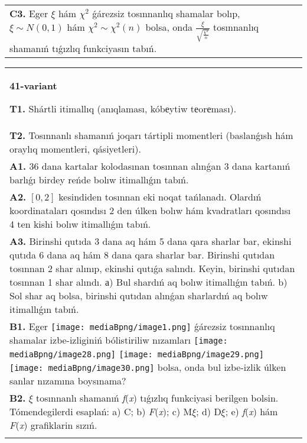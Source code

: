 \documentclass{article}
\begin{document}
\begin{tabular}{m{17cm}}
 \\
\textbf{C3.} Eger \(\xi\) hám \(\chi^{2}\) ǵárezsiz tosınnanlıq shamalar bolıp, \(\xi\sim N(0,1)\) hám \(\chi^{2}\sim\chi^{2}(n)\) bolsa, onda \(\frac{\xi}{\sqrt{\frac{\chi^{2}}{n}}}\) tosınnanlıq shamanıń tıǵızlıq funkciyasın tabıń.
 \\

\end{tabular}
\vspace{1cm}


\begin{tabular}{m{17cm}}
\textbf{41-variant}
\newline

\textbf{T1.} Shártli itimallıq (anıqlaması, kóbеytiw tеorеması).
 \\
\textbf{T2.} Tosınnanlı shamanıń joqarı tártipli momentleri (baslanǵısh hám oraylıq momentleri, qásiyetleri).
 \\
\textbf{A1.} 36 dana kartalar kolodasınan tosınnan alınǵan 3 dana kartanıń barlıǵı birdey reńde bolıw itimallıǵın tabıń.
 \\
\textbf{A2.} $\left[ 0,2 \right]$ kesindiden tosınnan eki noqat tańlanadı. Olardıń koordinataları qosındısı 2 den úlken bolıw hám kvadratları qosındısı 4 ten kishi bolıw itimallıǵın tabıń.
 \\
\textbf{A3.} Birinshi qutıda 3 dana aq hám 5 dana qara sharlar bar, ekinshi qutıda 6 dana aq hám 8 dana qara sharlar bar. Birinshi qutıdan tosınnan 2 shar alınıp, ekinshi qutıǵa salındı. Keyin, birinshi qutıdan tosınnan 1 shar alındı. а) Bul shardıń aq bolıw itimallıǵın tabıń. b) Sol shar aq bolsa, birinshi qutıdan alınǵan sharlardıń aq bolıw itimallıǵın tabıń.
 \\
\textbf{B1.} Eger \texttt{[image: mediaBpng/image1.png]} ǵárezsiz tosınnanlıq shamalar izbe-izliginiń bólistiriliw nızamları
\texttt{[image: mediaBpng/image28.png]} \texttt{[image: mediaBpng/image29.png]} \texttt{[image: mediaBpng/image30.png]}
bolsa, onda bul izbe-izlik úlken sanlar nızamına boysınama?
 \\
\textbf{B2.} $\xi$ tosınnanlı shamanıń \emph{f}(\emph{x}) tıǵızlıq funkciyasi berilgen bolsin. Tómendegilerdi esaplań: a) C; b) \emph{F}(\emph{x}); c) M$\xi$; d) D$\xi$; e) \emph{f}(\emph{x}) hám \emph{F}(\emph{x}) grafiklarin sızıń.\(f(x) = \left\{ \begin{matrix}
\ \ \ \ \ \ \ \ 0,\ \ \ \ \ \ x < 1, \\

\end{matrix}
\end{tabular}
\end{document}
